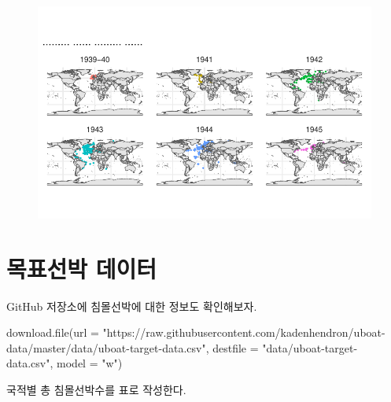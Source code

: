 \documentclass[
  letterpaper,
  chapter,a4paper,showtrims,openright,hidelinks]{oblivoir}
\newenvironment{Shaded}{\begin{snugshade}}{\end{snugshade}}
\newcommand{\AttributeTok}[1]{\textcolor[rgb]{0.40,0.45,0.13}{#1}}
\newcommand{\FunctionTok}[1]{\textcolor[rgb]{0.28,0.35,0.67}{#1}}
\newcommand{\NormalTok}[1]{\textcolor[rgb]{0.00,0.23,0.31}{#1}}
\newcommand{\StringTok}[1]{\textcolor[rgb]{0.13,0.47,0.30}{#1}}
\begin{document}
\begin{figure}[H]

{\centering \includegraphics{u_boats_files/figure-pdf/unnamed-chunk-6-1.pdf}

}

\end{figure}

\hypertarget{uxbaa9uxd45cuxc120uxbc15-uxb370uxc774uxd130}{%
\section{목표선박
데이터}\label{uxbaa9uxd45cuxc120uxbc15-uxb370uxc774uxd130}}

GitHub 저장소에 침몰선박에 대한 정보도 확인해보자.

\begin{Shaded}
\begin{Highlighting}[]
\FunctionTok{download.file}\NormalTok{(}\AttributeTok{url =} \StringTok{"https://raw.githubusercontent.com/kadenhendron/uboat{-}data/master/data/uboat{-}target{-}data.csv"}\NormalTok{, }
              \AttributeTok{destfile =} \StringTok{"data/uboat{-}target{-}data.csv"}\NormalTok{, }\AttributeTok{model =} \StringTok{"w"}\NormalTok{)}
\end{Highlighting}
\end{Shaded}

국적별 총 침몰선박수를 표로 작성한다.
\end{document}
